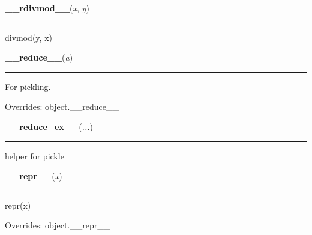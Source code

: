     \vspace{0.5ex}

    \begin{boxedminipage}{\textwidth}

    \raggedright \textbf{\_\_rdivmod\_\_}(\textit{x}, \textit{y})

    \vspace{-1.5ex}

    \rule{\textwidth}{0.5\fboxrule}

divmod(y, x)
    \vspace{1ex}

    \end{boxedminipage}

    \vspace{0.5ex}

    \begin{boxedminipage}{\textwidth}

    \raggedright \textbf{\_\_reduce\_\_}(\textit{a})

    \vspace{-1.5ex}

    \rule{\textwidth}{0.5\fboxrule}

For pickling.
    \vspace{1ex}

      Overrides: object.\_\_reduce\_\_

    \end{boxedminipage}

    \label{object:__reduce_ex__}

    \vspace{0.5ex}

    \begin{boxedminipage}{\textwidth}

    \raggedright \textbf{\_\_reduce\_ex\_\_}(\textit{...})

    \vspace{-1.5ex}

    \rule{\textwidth}{0.5\fboxrule}

helper for pickle
    \vspace{1ex}

    \end{boxedminipage}

    \vspace{0.5ex}

    \begin{boxedminipage}{\textwidth}

    \raggedright \textbf{\_\_repr\_\_}(\textit{x})

    \vspace{-1.5ex}

    \rule{\textwidth}{0.5\fboxrule}

repr(x)
    \vspace{1ex}

      Overrides: object.\_\_repr\_\_

    \end{boxedminipage}

